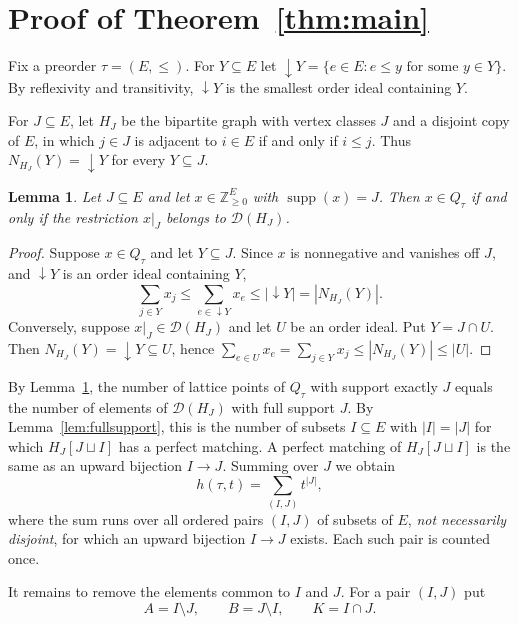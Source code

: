 \documentclass[11pt]{amsart}
\newtheorem{lemma}[theorem]{Lemma}
\theoremstyle{definition}
\theoremstyle{remark}
\numberwithin{equation}{section}
\newcommand{\Zge}{\mathbb{Z}_{\ge 0}}
\newcommand{\supp}{\operatorname{supp}}
\newcommand{\Dr}{\mathcal{D}}
\newcommand{\down}{{\downarrow}}
\begin{document}
\section{Proof of Theorem~\ref{thm:main}}\label{sec:proof}

Fix a preorder $\tau=(E,\le)$. For $Y\subseteq E$ let $\down Y=\{e\in E: e\le y \text{ for some } y\in Y\}$. By reflexivity and transitivity, $\down Y$ is the smallest order ideal containing $Y$.

For $J\subseteq E$, let $H_J$ be the bipartite graph with vertex classes $J$ and a disjoint copy of $E$, in which $j\in J$ is adjacent to $i\in E$ if and only if $i\le j$. Thus $N_{H_J}(Y)=\down Y$ for every $Y\subseteq J$.

\begin{lemma}\label{lem:reduction}
Let $J\subseteq E$ and let $x\in\Zge^E$ with $\supp(x)=J$. Then $x\in Q_\tau$ if and only if the restriction $x|_J$ belongs to $\Dr(H_J)$.
\end{lemma}

\begin{proof}
Suppose $x\in Q_\tau$ and let $Y\subseteq J$. Since $x$ is nonnegative and vanishes off $J$, and $\down Y$ is an order ideal containing $Y$,
\[
\sum_{j\in Y}x_j\le \sum_{e\in\down Y}x_e\le|\down Y|=|N_{H_J}(Y)|.
\]
Conversely, suppose $x|_J\in\Dr(H_J)$ and let $U$ be an order ideal. Put $Y=J\cap U$. Then $N_{H_J}(Y)=\down Y\subseteq U$, hence $\sum_{e\in U}x_e=\sum_{j\in Y}x_j\le|N_{H_J}(Y)|\le|U|$.
\end{proof}

By Lemma~\ref{lem:reduction}, the number of lattice points of $Q_\tau$ with support exactly $J$ equals the number of elements of $\Dr(H_J)$ with full support $J$. By Lemma~\ref{lem:fullsupport}, this is the number of subsets $I\subseteq E$ with $|I|=|J|$ for which $H_J[J\sqcup I]$ has a perfect matching. A perfect matching of $H_J[J\sqcup I]$ is the same as an upward bijection $I\to J$. Summing over $J$ we obtain
\begin{equation}\label{eq:overlap}
h(\tau,t)=\sum_{(I,J)} t^{|J|},
\end{equation}
where the sum runs over all ordered pairs $(I,J)$ of subsets of $E$, \emph{not necessarily disjoint}, for which an upward bijection $I\to J$ exists. Each such pair is counted once.

It remains to remove the elements common to $I$ and $J$. For a pair $(I,J)$ put
\[
A=I\setminus J,\qquad B=J\setminus I,\qquad K=I\cap J .
\]
\end{document}
